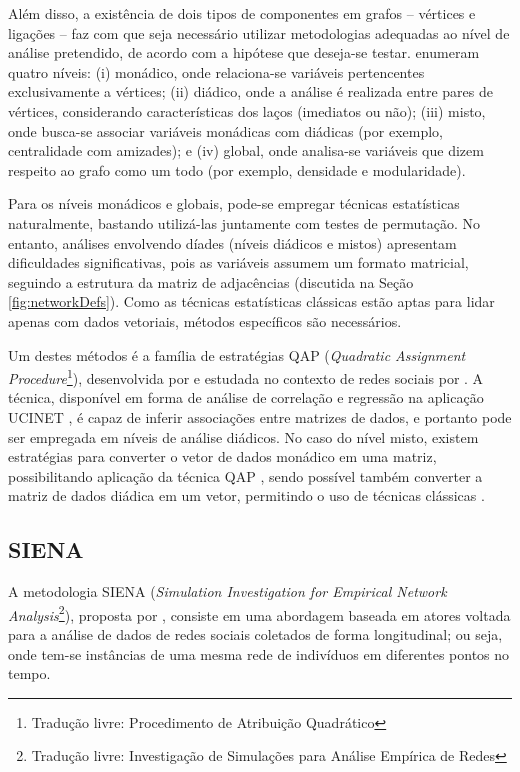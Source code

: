 Além disso, a existência de dois tipos de componentes em grafos -- vértices e ligações -- faz com que seja necessário utilizar metodologias adequadas ao nível de análise pretendido, de acordo com a hipótese que deseja-se testar.  enumeram quatro níveis: (i) monádico, onde relaciona-se variáveis pertencentes exclusivamente a vértices; (ii) diádico, onde a análise é realizada entre pares de vértices, considerando características dos laços (imediatos ou não); (iii) misto, onde busca-se associar variáveis monádicas com diádicas (por exemplo, centralidade com amizades); e (iv) global, onde analisa-se variáveis que dizem respeito ao grafo como um todo (por exemplo, densidade e modularidade).

Para os níveis monádicos e globais, pode-se empregar técnicas estatísticas naturalmente, bastando utilizá-las juntamente com testes de permutação. No entanto, análises envolvendo díades (níveis diádicos e mistos) apresentam dificuldades significativas, pois as variáveis assumem um formato matricial, seguindo a estrutura da matriz de adjacências (discutida na Seção \ref{fig:networkDefs}). Como as técnicas estatísticas clássicas estão aptas para lidar apenas com dados vetoriais, métodos específicos são necessários.

Um destes métodos é a família de estratégias QAP (\textit{Quadratic Assignment Procedure}\footnote{Tradução livre: Procedimento de Atribuição Quadrático}), desenvolvida por  e estudada no contexto de redes sociais por . A técnica, disponível em forma de análise de correlação e regressão na aplicação UCINET \cite{Borgatti2013}, é capaz de inferir associações entre matrizes de dados, e portanto pode ser empregada em níveis de análise diádicos. No caso do nível misto, existem estratégias para converter o vetor de dados monádico em uma matriz, possibilitando aplicação da técnica QAP \cite{Borgatti2013}, sendo possível também converter a matriz de dados diádica em um vetor, permitindo o uso de técnicas clássicas \cite{Blansky2013}.

\subsection{SIENA} \label{sec:siena}

A metodologia SIENA (\textit{Simulation Investigation for Empirical Network Analysis}\footnote{Tradução livre: Investigação de Simulações para Análise Empírica de Redes}), proposta por , consiste em uma abordagem baseada em atores voltada para a análise de dados de redes sociais coletados de forma longitudinal; ou seja, onde tem-se instâncias de uma mesma rede de indivíduos em diferentes pontos no tempo.

